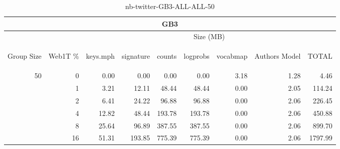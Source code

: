 \begin{center}
\begin{table}[htbp] 
 \begin{center}
\begin{tabular}{ | r | r | r | r | r | r | r | r | r |}
\hline
\multicolumn{9}{|c|}{GB3}\\
\hline
 & & \multicolumn{7}{|c|}{Size (MB)}\\ \cline{3-9}
\begin{sideways}Group Size\end{sideways} & \begin{sideways}Web1T \% \end{sideways} & \begin{sideways}keys.mph\end{sideways} & \begin{sideways}signature\end{sideways} & \begin{sideways}counts\end{sideways} & \begin{sideways}logprobs\end{sideways} & \begin{sideways}vocabmap\end{sideways} & \begin{sideways}Authors Model \end{sideways} & \begin{sideways}TOTAL\end{sideways}\\
\hline
\multirow{5}{*}{50}
 & 0 & 0.00 & 0.00 & 0.00 & 0.00 & 3.18 & 1.28 & 4.46\\ \cline{2-9}
 & 1 & 3.21 & 12.11 & 48.44 & 48.44 & 0.00 & 2.05 & 114.24\\ \cline{2-9}
 & 2 & 6.41 & 24.22 & 96.88 & 96.88 & 0.00 & 2.06 & 226.45\\ \cline{2-9}
 & 4 & 12.82 & 48.44 & 193.78 & 193.78 & 0.00 & 2.06 & 450.88\\ \cline{2-9}
 & 8 & 25.64 & 96.89 & 387.55 & 387.55 & 0.00 & 2.06 & 899.70\\ \cline{2-9}
 & 16 & 51.31 & 193.85 & 775.39 & 775.39 & 0.00 & 2.06 & 1797.99\\ \cline{2-9}
\hline
\end{tabular}
\caption{nb-twitter-GB3-ALL-ALL-50}
\label{table:nb-twitter-GB3-ALL-ALL-50}
\end{center}
 \end{table}
\end{center}

